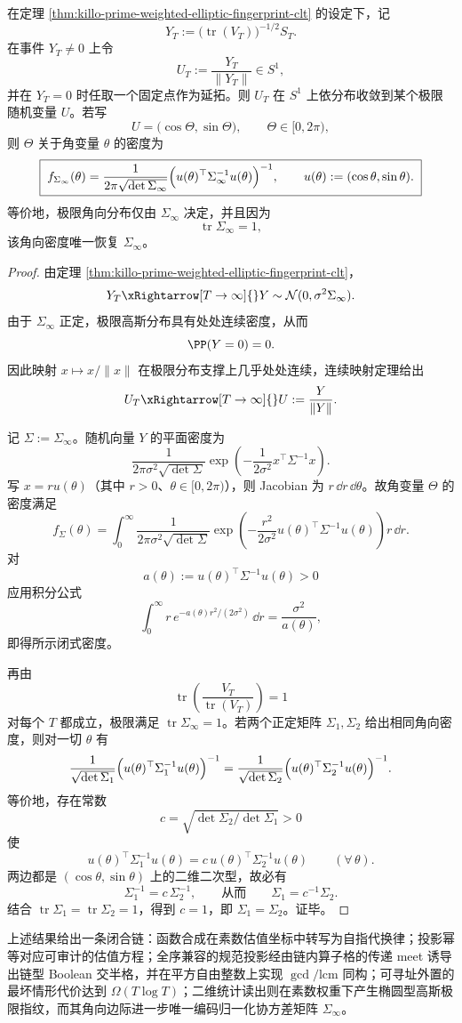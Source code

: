 \begin{corollary}\label{cor:killo-prime-weighted-angular-law-sigma-recovery}
在定理 \ref{thm:killo-prime-weighted-elliptic-fingerprint-clt} 的设定下，记
\[
Y_T:=\bigl(\operatorname{tr}(V_T)\bigr)^{-1/2}S_T.
\]
在事件 \(Y_T\neq 0\) 上令
\[
U_T:=\frac{Y_T}{\|Y_T\|}\in S^1,
\]
并在 \(Y_T=0\) 时任取一个固定点作为延拓。则 \(U_T\) 在 \(S^1\) 上依分布收敛到某个极限随机变量 \(U\)。若写
\[
U=\bigl(\cos\Theta,\sin\Theta\bigr),\qquad \Theta\in[0,2\pi),
\]
则 \(\Theta\) 关于角变量 \(\theta\) 的密度为
\[
\boxed{\;
f_{\Sigma_\infty}(\theta)=
\frac{1}{2\pi\sqrt{\det\Sigma_\infty}}
\Bigl(u(\theta)^\top\Sigma_\infty^{-1}u(\theta)\Bigr)^{-1},
\qquad
u(\theta):=(\cos\theta,\sin\theta).
\;}
\]
等价地，极限角向分布仅由 \(\Sigma_\infty\) 决定，并且因为
\[
\operatorname{tr}\Sigma_\infty=1,
\]
该角向密度唯一恢复 \(\Sigma_\infty\)。
\end{corollary}
\begin{proof}
由定理 \ref{thm:killo-prime-weighted-elliptic-fingerprint-clt}，
\[
Y_T\xRightarrow[T\to\infty]{}Y\sim \mathcal N(0,\sigma^2\Sigma_\infty).
\]
由于 \(\Sigma_\infty\) 正定，极限高斯分布具有处处连续密度，从而
\[
\PP(Y=0)=0.
\]
因此映射 \(x\mapsto x/\|x\|\) 在极限分布支撑上几乎处处连续，连续映射定理给出
\[
U_T\xRightarrow[T\to\infty]{}U:=\frac{Y}{\|Y\|}.
\]

记 \(\Sigma:=\Sigma_\infty\)。随机向量 \(Y\) 的平面密度为
\[
\frac{1}{2\pi\sigma^2\sqrt{\det\Sigma}}
\exp\!\left(-\frac{1}{2\sigma^2}x^\top\Sigma^{-1}x\right).
\]
写 \(x=ru(\theta)\)（其中 \(r>0\)、\(\theta\in[0,2\pi)\)），则 Jacobian 为 \(r\,\dd r\,\dd\theta\)。故角变量 \(\Theta\) 的密度满足
\[
f_\Sigma(\theta)
=
\int_0^\infty
\frac{1}{2\pi\sigma^2\sqrt{\det\Sigma}}
\exp\!\left(
-\frac{r^2}{2\sigma^2}u(\theta)^\top\Sigma^{-1}u(\theta)
\right)
r\,\dd r.
\]
对
\[
a(\theta):=u(\theta)^\top\Sigma^{-1}u(\theta)>0
\]
应用积分公式
\[
\int_0^\infty r\,e^{-a(\theta)r^2/(2\sigma^2)}\,\dd r
=\frac{\sigma^2}{a(\theta)},
\]
即得所示闭式密度。

再由
\[
\operatorname{tr}\!\left(\frac{V_T}{\operatorname{tr}(V_T)}\right)=1
\]
对每个 \(T\) 都成立，极限满足 \(\operatorname{tr}\Sigma_\infty=1\)。若两个正定矩阵 \(\Sigma_1,\Sigma_2\) 给出相同角向密度，则对一切 \(\theta\) 有
\[
\frac{1}{\sqrt{\det\Sigma_1}}
\Bigl(u(\theta)^\top\Sigma_1^{-1}u(\theta)\Bigr)^{-1}
=
\frac{1}{\sqrt{\det\Sigma_2}}
\Bigl(u(\theta)^\top\Sigma_2^{-1}u(\theta)\Bigr)^{-1}.
\]
等价地，存在常数
\[
c=\sqrt{\det\Sigma_2/\det\Sigma_1}>0
\]
使
\[
u(\theta)^\top\Sigma_1^{-1}u(\theta)
=
c\,u(\theta)^\top\Sigma_2^{-1}u(\theta)
\qquad
(\forall\,\theta).
\]
两边都是 \((\cos\theta,\sin\theta)\) 上的二维二次型，故必有
\[
\Sigma_1^{-1}=c\,\Sigma_2^{-1},
\qquad\text{从而}\qquad
\Sigma_1=c^{-1}\Sigma_2.
\]
结合 \(\operatorname{tr}\Sigma_1=\operatorname{tr}\Sigma_2=1\)，得到 \(c=1\)，即 \(\Sigma_1=\Sigma_2\)。证毕。
\end{proof}

上述结果给出一条闭合链：函数合成在素数估值坐标中转写为自指代换律；投影幂等对应可审计的估值方程；全序兼容的规范投影经由链内算子格的传递 meet 诱导出链型 Boolean 交半格，并在平方自由整数上实现 \(\gcd/\mathrm{lcm}\) 同构；可寻址外置的最坏情形代价达到 \(\Omega(T\log T)\)；二维统计读出则在素数权重下产生椭圆型高斯极限指纹，而其角向边际进一步唯一编码归一化协方差矩阵 \(\Sigma_\infty\)。
